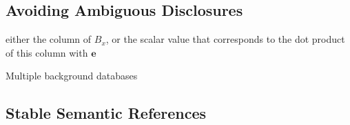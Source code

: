 \subsection{Avoiding Ambiguous Disclosures}





either the column of $B_x$, or the scalar value that corresponds to the dot product of this column with $\mathbf{e}$


Multiple background databases


\subsection{Stable Semantic References}


